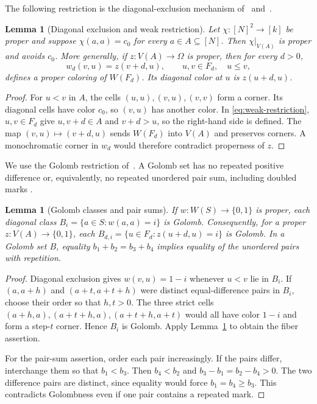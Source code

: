 \documentclass[11pt,a4paper]{article}
\newtheorem{lemma}[theorem]{Lemma}
\theoremstyle{definition}
\numberwithin{equation}{section}
\begin{document}
The following restriction is the diagonal-exclusion mechanism
of~\cite[Theorem~2.3]{CCFGMS23} and~\cite[Theorem~2]{MSY25}.

\begin{lemma}[Diagonal exclusion and weak restriction]\label{lem:restriction}
Let $\chi:[N]^2\to[k]$ be proper and suppose
$\chi(a,a)=c_0$ for every $a\in A\subseteq[N]$.
Then $\chi|_{V(A)}$ is proper and avoids $c_0$.
More generally, if $z:V(A)\to\Omega$ is proper, then for every $d>0$,
\begin{equation}\label{eq:weak-restriction}
w_d(v,u)=z(v+d,u),\qquad u,v\in F_d,\quad u\le v,
\end{equation}
defines a proper coloring of $W(F_d)$. Its diagonal color at $u$ is
$z(u+d,u)$.
\end{lemma}
\begin{proof}
For $u<v$ in $A$, the cells $(u,u),(v,u),(v,v)$ form a corner.
Its diagonal cells have color $c_0$, so $(v,u)$ has another color.
In \eqref{eq:weak-restriction}, $u,v\in F_d$ give
$u,v+d\in A$ and $v+d>u$, so the right-hand side is defined.
The map $(v,u)\mapsto(v+d,u)$ sends $W(F_d)$ into $V(A)$ and preserves
corners. A monochromatic corner in $w_d$ would therefore contradict
properness of $z$.
\end{proof}

We use the Golomb restriction of~\cite[proof of Theorem~6]{MSY25}.
A Golomb set has no repeated positive difference or, equivalently, no
repeated unordered pair sum, including doubled marks
\cite{OB04,D09}.

\begin{lemma}[Golomb classes and pair sums]\label{lem:golomb}
If $w:W(S)\to\{0,1\}$ is proper, each diagonal class
$B_i=\{a\in S:w(a,a)=i\}$ is Golomb.
Consequently, for a proper $z:V(A)\to\{0,1\}$, each
$B_{d,i}=\{u\in F_d:z(u+d,u)=i\}$ is Golomb.
In a Golomb set $B$, equality $b_1+b_2=b_3+b_4$ implies equality
of the unordered pairs with repetition.
\end{lemma}
\begin{proof}
Diagonal exclusion gives $w(v,u)=1-i$ whenever $u<v$ lie in $B_i$.
If $(a,a+h)$ and $(a+t,a+t+h)$ were distinct equal-difference pairs
in $B_i$, choose their order so that $h,t>0$.
The three strict cells
$(a+h,a),(a+t+h,a),(a+t+h,a+t)$ would all have color $1-i$ and form
a step-$t$ corner. Hence $B_i$ is Golomb.
Apply Lemma~\ref{lem:restriction} to obtain the fiber assertion.

For the pair-sum assertion, order each pair increasingly.
If the pairs differ, interchange them so that $b_1<b_3$.
Then $b_4<b_2$ and $b_3-b_1=b_2-b_4>0$.
The two difference pairs are distinct, since equality would force
$b_1=b_4\ge b_3$. This contradicts Golombness even if one pair
contains a repeated mark.
\end{proof}
\end{document}

